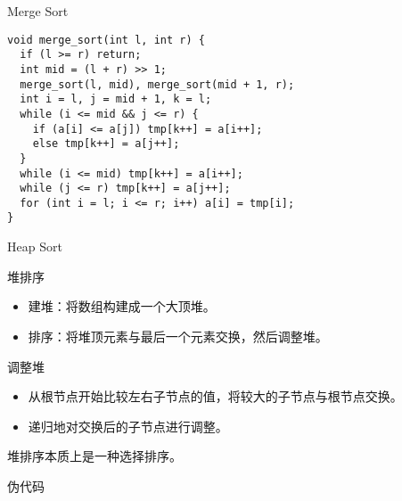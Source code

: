 \documentclass{ldr-simple-gray}
\begin{document}
  \begin{frame}[fragile]{Merge Sort}
    \begin{verbatim}
void merge_sort(int l, int r) {
  if (l >= r) return;
  int mid = (l + r) >> 1;
  merge_sort(l, mid), merge_sort(mid + 1, r);
  int i = l, j = mid + 1, k = l;
  while (i <= mid && j <= r) {
    if (a[i] <= a[j]) tmp[k++] = a[i++];
    else tmp[k++] = a[j++];
  }
  while (i <= mid) tmp[k++] = a[i++];
  while (j <= r) tmp[k++] = a[j++];
  for (int i = l; i <= r; i++) a[i] = tmp[i];
}
    \end{verbatim}
  \end{frame}

  \begin{frame}{Heap Sort}
    \begin{block}{堆排序}
      \begin{itemize}
        \item 建堆：将数组构建成一个大顶堆。
        \item 排序：将堆顶元素与最后一个元素交换，然后调整堆。
      \end{itemize}
    \end{block}
    \begin{block}{调整堆}
      \begin{itemize}
        \item 从根节点开始比较左右子节点的值，将较大的子节点与根节点交换。
        \item 递归地对交换后的子节点进行调整。
      \end{itemize}
    \end{block}
    堆排序本质上是一种选择排序。
  \end{frame}

  \begin{frame}{伪代码}
    \begin{algorithm}[H]
      \caption{Heap Sort}
      \begin{algorithmic}[1]
        \ENDFOR
      \end{algorithmic}
    \end{algorithm}

    \begin{algorithm}[H]
      \caption{Build Heap}
      \begin{algorithmic}[1]
        \ENDFOR
      \end{algorithmic}
    \end{algorithm}
  \end{frame}
\end{document}
